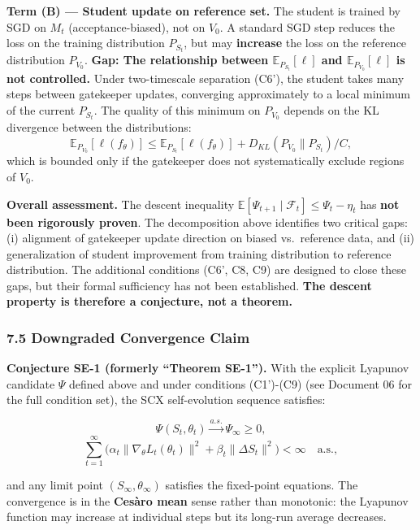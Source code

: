 \documentclass[
  12pt,
]{ctexart}
\begin{document}
\textbf{Term (B) --- Student update on reference set.} The student is
trained by SGD on \(M_t\) (acceptance-biased), not on \(V_0\). A
standard SGD step reduces the loss on the training distribution
\(P_{S_t}\), but may \textbf{increase} the loss on the reference
distribution \(P_{V_0}\). \textbf{Gap: The relationship between
\(\mathbb{E}_{P_{S_t}}[\ell]\) and \(\mathbb{E}_{P_{V_0}}[\ell]\) is not
controlled.} Under two-timescale separation (C6'), the student takes
many steps between gatekeeper updates, converging approximately to a
local minimum of the current \(P_{S_t}\). The quality of this minimum on
\(P_{V_0}\) depends on the KL divergence between the distributions:
\[\mathbb{E}_{P_{V_0}}[\ell(f_\theta)] \leq \mathbb{E}_{P_{S_t}}[\ell(f_\theta)] + D_{KL}(P_{V_0} \| P_{S_t})/C,\]
which is bounded only if the gatekeeper does not systematically exclude
regions of \(V_0\).

\textbf{Overall assessment.} The descent inequality
\(\mathbb{E}[\Psi_{t+1} \mid \mathcal{F}_t] \leq \Psi_t - \eta_t\) has
\textbf{not been rigorously proven}. The decomposition above identifies
two critical gaps: (i) alignment of gatekeeper update direction on
biased vs.~reference data, and (ii) generalization of student
improvement from training distribution to reference distribution. The
additional conditions (C6', C8, C9) are designed to close these gaps,
but their formal sufficiency has not been established. \textbf{The
descent property is therefore a conjecture, not a theorem.}

\subsubsection{7.5 Downgraded Convergence
Claim}\label{downgraded-convergence-claim}

\textbf{Conjecture SE-1 (formerly ``Theorem SE-1'').} With the explicit
Lyapunov candidate \(\Psi\) defined above and under conditions
(C1')-(C9) (see Document 06 for the full condition set), the SCX
self-evolution sequence satisfies:

\[\Psi(S_t, \theta_t) \xrightarrow{a.s.} \Psi_\infty \geq 0,\]
\[\sum_{t=1}^\infty \bigl( \alpha_t \|\nabla_\theta L_t(\theta_t)\|^2 + \beta_t \|\Delta S_t\|^2 \bigr) < \infty \quad \text{a.s.},\]

and any limit point \((S_\infty, \theta_\infty)\) satisfies the
fixed-point equations. The convergence is in the \textbf{Cesàro mean}
sense rather than monotonic: the Lyapunov function may increase at
individual steps but its long-run average decreases.
\end{document}
